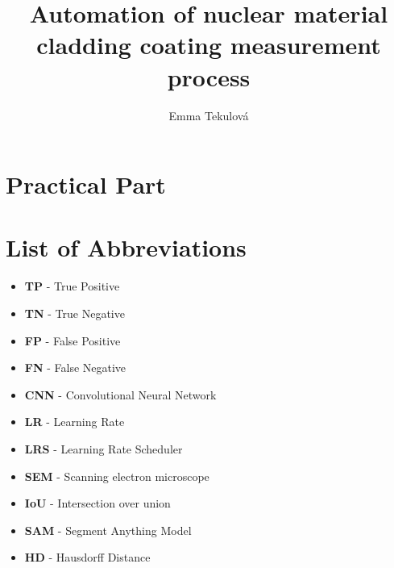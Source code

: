 \documentclass[12pt,a4paper]{report}
\title{Automation of nuclear material cladding coating measurement process}
\author{Emma Tekulová}
\newcommand{\vskipbefore}{\vspace{-2cm}} %
\begin{document}

\newpage
\thispagestyle{empty}
\null
\newpage



\vskipbefore %


\renewcommand{\contentsname}{\vspace{-1.5cm}Contents}
\tableofcontents

\newpage

\cleardoublepage
{}
\setcounter{page}{1}



\chapter{Practical Part}











\newpage
\listoffigures
\newpage
\listoftables


\chapter{List of Abbreviations}
\begin{itemize}
    \item \textbf{TP} - True Positive
    \item \textbf{TN} - True Negative
    \item \textbf{FP} - False Positive
    \item \textbf{FN} - False Negative
    \item \textbf{CNN} - Convolutional Neural Network
    \item \textbf{LR} - Learning Rate
    \item \textbf{LRS} - Learning Rate Scheduler
    \item \textbf{SEM} - Scanning electron microscope
    \item \textbf{IoU} - Intersection over union
    \item \textbf{SAM} - Segment Anything Model
    \item \textbf{HD} - Hausdorff Distance
    
\end{itemize}
\end{document}
